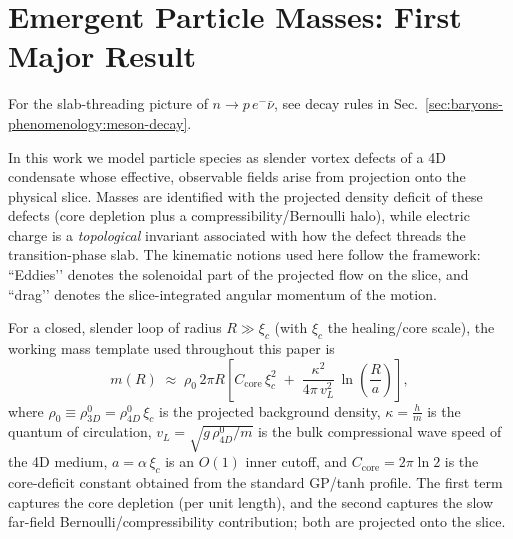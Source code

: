 \section{Emergent Particle Masses: First Major Result}\label{sec:emergent-particles}


For the slab-threading picture of $n\!\to\! p\,e^-\bar\nu$, see decay rules in Sec.~\ref{sec:baryons-phenomenology:meson-decay}.
\medskip

In this work we model particle species as slender vortex defects of a 4D condensate whose effective, observable fields arise from projection onto the physical slice. Masses are identified with the projected density deficit of these defects (core depletion plus a compressibility/Bernoulli halo), while electric charge is a \emph{topological} invariant associated with how the defect threads the transition-phase slab. The kinematic notions used here follow the framework: “Eddies’’ denotes the solenoidal part of the projected flow on the slice, and “drag’’ denotes the slice-integrated angular momentum of the motion.

For a closed, slender loop of radius $R\gg\xi_c$ (with $\xi_c$ the healing/core scale), the working mass template used throughout this paper is
\begin{equation}
\label{eq:mass-template}
m(R)\;\approx\;\rho_0\,2\pi R\left[
C_{\mathrm{core}}\,\xi_c^2\;+\;\frac{\kappa^2}{4\pi\,v_L^2}\,
\ln\!\left(\frac{R}{a}\right)\right],
\end{equation}
where $\rho_0\equiv \rho_{3D}^0=\rho_{4D}^0\,\xi_c$ is the projected background density, $\kappa=\frac{h}{m}$ is the quantum of circulation, $v_L=\sqrt{g\,\rho_{4D}^0/m}$ is the bulk compressional wave speed of the 4D medium, $a=\alpha\,\xi_c$ is an $O(1)$ inner cutoff, and $C_{\mathrm{core}}=2\pi\ln 2$ is the core-deficit constant obtained from the standard GP/tanh profile. The first term captures the core depletion (per unit length), and the second captures the slow far-field Bernoulli/compressibility contribution; both are projected onto the slice.

